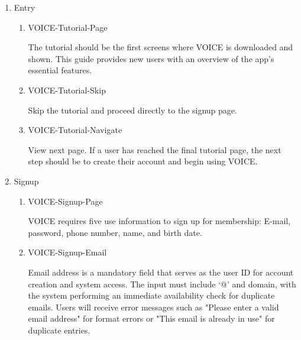 \documentclass[conference]{IEEEtran}
\begin{document}
\begin{enumerate}[label=\arabic*]
    \item Entry\par
    \vspace{0.3em}

    \begin{enumerate}[label=\arabic*)]
        \item VOICE-Tutorial-Page\par
        \vspace{0.3em}
        The tutorial should be the first screens where VOICE is downloaded and shown. This guide provides new users with an overview of the app's essential features.

        \vspace{1em}

        \item VOICE-Tutorial-Skip\par
        \vspace{0.3em}
        Skip the tutorial and proceed directly to the signup page.

        \vspace{1em}

        \item VOICE-Tutorial-Navigate\par
        \vspace{0.3em}
        View next page. If a user has reached the final tutorial page, the next step should be to create their account and begin using VOICE.
    \end{enumerate}  

    \vspace{1em}
    
    \item Signup\par
    \vspace{0.3em}

    \begin{enumerate}[label=\arabic*)]
        \item VOICE-Signup-Page\par
        \vspace{0.3em}
        VOICE requires five use information to sign up for membership: E-mail, password, phone number, name, and birth date.

        \vspace{1em}

        \item VOICE-Signup-Email\par
        \vspace{0.3em}
        Email address is a mandatory field that serves as the user ID for account creation and system access. The input must include ‘@’ and domain, with the system performing an immediate availability check for duplicate emails. Users will receive error messages such as "Please enter a valid email address" for format errors or "This email is already in use" for duplicate entries.


\end{enumerate}
\end{enumerate}
\end{document}
